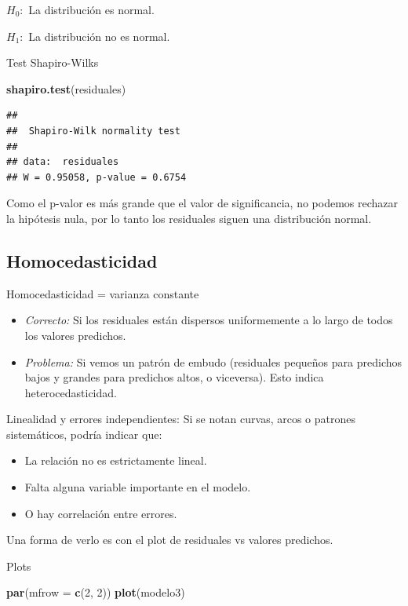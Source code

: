 \documentclass[
]{book}
\newenvironment{Shaded}{\begin{snugshade}}{\end{snugshade}}
\newcommand{\AttributeTok}[1]{\textcolor[rgb]{0.13,0.29,0.53}{#1}}
\newcommand{\DecValTok}[1]{\textcolor[rgb]{0.00,0.00,0.81}{#1}}
\newcommand{\FunctionTok}[1]{\textcolor[rgb]{0.13,0.29,0.53}{\textbf{#1}}}
\newcommand{\NormalTok}[1]{#1}
\begin{document}
\(H_0:\) La distribución es normal.

\(H_1:\) La distribución no es normal.

Test Shapiro-Wilks

\begin{Shaded}
\begin{Highlighting}[]
\FunctionTok{shapiro.test}\NormalTok{(residuales)}
\end{Highlighting}
\end{Shaded}

\begin{verbatim}
## 
##  Shapiro-Wilk normality test
## 
## data:  residuales
## W = 0.95058, p-value = 0.6754
\end{verbatim}

Como el p-valor es más grande que el valor de significancia, no podemos rechazar la hipótesis nula, por lo tanto los residuales siguen una distribución normal.

\subsection{Homocedasticidad}\label{homocedasticidad}

Homocedasticidad = varianza constante

\begin{itemize}
\item
  \emph{Correcto:} Si los residuales están dispersos uniformemente a lo largo de todos los valores predichos.
\item
  \emph{Problema:} Si vemos un patrón de embudo (residuales pequeños para predichos bajos y grandes para predichos altos, o viceversa). Esto indica heterocedasticidad.
\end{itemize}

Linealidad y errores independientes: Si se notan curvas, arcos o patrones sistemáticos, podría indicar que:

\begin{itemize}
\item
  La relación no es estrictamente lineal.
\item
  Falta alguna variable importante en el modelo.
\item
  O hay correlación entre errores.
\end{itemize}

Una forma de verlo es con el plot de residuales vs valores predichos.

Plots

\begin{Shaded}
\begin{Highlighting}[]
\FunctionTok{par}\NormalTok{(}\AttributeTok{mfrow =} \FunctionTok{c}\NormalTok{(}\DecValTok{2}\NormalTok{, }\DecValTok{2}\NormalTok{))}
\FunctionTok{plot}\NormalTok{(modelo3)}
\end{Highlighting}
\end{Shaded}
\end{document}
